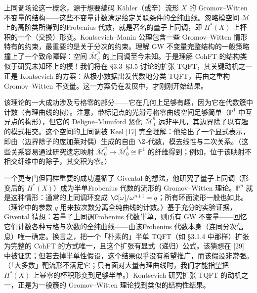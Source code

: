 上同调场论这一概念，源于想要编码 Kähler（或辛）流形 $X$ 的 Gromov--Witten 不变量的结构——这些不变量计数满足给定关联条件的全纯曲线。忽略模空间 $\overline{\mathcal{M}}$ 上的高阶类所得到的Frobenius 代数，就是著名的量子上同调，即 $H^*(X)$ 上杯积的一个（交换）形变。Kontsevich--Manin 公理包含一些 Gromov--Witten 情形特有的约束，最重要的是关于分次的约束。理解 GW 不变量完整结构的一般策略撞上了一个致命障碍：空间 $\overline{\mathcal{M}}^n_g$ 的上同调至今未知。于是理解 CohFT 的结构类似于研究未知环上的模！我们将在 §3.3–§3.5 讨论的扩张 TQFT，其关键动机之一正是 Kontsevich 的方案：从极小数据出发代数地分类 TQFT，再由之重构 Gromov--Witten 不变量。这一方案仍在发展中，才刚刚开始结果。

该理论的一大成功涉及亏格零的部分——它在几何上足够有趣，因为它在代数簇中计数（有理曲线的树）。注意，带标记点的光滑亏格零曲线空间足够简单（$\mathbb{P}^1$ 中互异点的构形），但它的 Deligne--Mumford 紧化 $\overline{\mathcal{M}}^n_0$ 远非平凡，其边界除子以有趣的模式相交。这个空间的上同调被 Keel [17] 完全理解：他给出了一个显式表示，即由（边界除子的庞加莱对偶）生成的自由 $\Z$-代数，模去线性与二次关系。（这些关系容易通过研究遗忘映射 $\overline{\mathcal{M}}^n_0\to\overline{\mathcal{M}}^4_0\cong\mathbb{P}^1$ 的纤维得到；例如，位于该映射不相交纤维中的除子，其交积为零。）

一个更专门但同样重要的成功遵循了 Givental 的想法，他研究了量子上同调（形变后的 $H^*(X)$）成为半单Frobenius 代数的流形的 Gromov--Witten 理论。$\mathbb{P}^n$ 就是这种情形：通常的上同调环变成 $\C[\omega]/\omega^{n+1}=q$；所有环面流形一般也如此。（理论中的参数 $q$ 用来按次数分离全纯曲线的计数。）基于充分的实验证据，Givental 猜想：若量子上同调Frobenius 代数半单，则所有 GW 不变量——回忆它们计数各种亏格与次数的全纯曲线——由该Frobenius 代数本身（连同分次信息）唯一确定。换言之，把一个「朴素的」半单 TQFT（如 §3.1.4 中那样）扩张为完整的 CohFT 的方式唯一，且这个扩张有显式（递归）公式。该猜想在 [29] 中被证实；但若去掉半单性假设，这个结果似乎没有希望推广，而该假设非常强。（「大多数」靶流形不满足它；只有面对大量有理曲线时，我们才能指望把 $H^*(X)$ 上幂零的杯积形变到足够半单。）Kontsevich 研究扩张 TQFT 的动机之一，正是为一般簇的 Gromov--Witten 理论找到类似的结构性结果。
